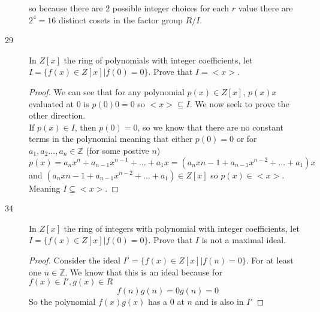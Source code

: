 \documentclass[11pt]{article}
\newcommand{\Z}{\mathbb{Z}}
\begin{document}
\begin{description}
			 so because there are $2$ possible integer choices for
			 each $r$ value there are $2^4 = 16$ distinct cosets in
			 the factor group $R/I$.
	\item[29] In $Z[x]$ the ring of polynomials with integer coefficients, let $ I = \{f(x) \in
		Z[x]|f(0) = 0 \} $. Prove that $ I = <x> $.
	\begin{proof}
		We can see that for any polynomial $p(x) \in Z[x]$, $ p(x)  x $
		evaluated at $0$ is $p(0)  0 = 0$ so $ <x> \subseteq I $. We
		now seek to prove the other direction.\\
		If $p(x) \in I$, then $p(0) = 0$, so we know that there are no
		constant terms in the polynomial meaning that either $p(0) = 0$
		or for $a_1,a_2 ..., a_n \in \Z$ (for some postive $n$)
		$$ p(x) = a_nx^n+a_{n-1}x^{n-1} +... +a_1x = (a_nx{n-1} +
		a_{n-1}x^{n-2} + ... + a_1)x $$
		and $(a_nx{n-1} + a_{n-1}x^{n-2} + ... + a_1) \in Z[x]$ so $p(x)
		\in <x>$. Meaning $I \subseteq <x>$.
	\end{proof}		
	\item[34] In $Z[x]$ the ring of integers with polynomial 
		with integer coefficients, let $ I = \{f(x) \in
		Z[x]|f(0) = 0 \} $. Prove that $ I $ is not a maximal ideal.

	\begin{proof}
		Consider the ideal $ I'  = \{f(x) \in Z[x]|f(n) = 0\} $. For at
		least one $n \in \Z$.
		We know that this is an ideal because for $f(x) \in I', g(x) \in
		R$
			$$ f(n)g(n) = 0g(n) = 0 $$
		So the polynomial $ f(x)g(x) $ has a $0$ at $n$ and is also in
		$I'$
		 

\end{proof}
\end{description}
\end{document}
